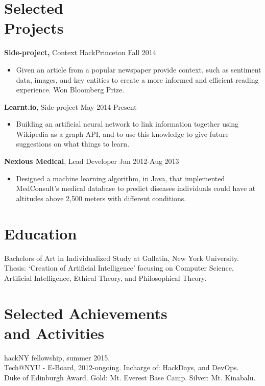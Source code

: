 \documentclass[margin]{res}
\begin{document}
\begin{resume}
\section{Selected \\ Projects}
{\bf Side-project,} Context \hfill HackPrinceton Fall 2014
\begin{itemize} \itemsep -2pt 
\item Given an article from a popular newspaper provide context, such as sentiment data, images, and key entities to create a more informed and efficient reading experience. Won Bloomberg Prize.
\end{itemize}
 
{\bf Learnt.io}, Side-project \hfill May 2014-Present
\begin{itemize} \itemsep -2pt 
\item Building an artificial neural network to link information together using Wikipedia as a graph API, and to use this knowledge to give future suggestions on what things to learn.
\end{itemize}
 
{\bf Nexious Medical}, Lead Developer \hfill Jan 2012-Aug 2013
\begin{itemize} \itemsep -2pt
\item Designed a machine learning algorithm, in Java, that implemented MedConsult's medical database to predict diseases individuals could have at altitudes above 2,500 meters with different conditions.
 \end{itemize}

\section{Education} 
Bachelors of Art in Individualized Study at Gallatin, New York University. \\
Thesis: `Creation of Artificial Intelligence' focusing on Computer Science, Artificial Intelligence, Ethical Theory, and Philosophical Theory.

\section{Selected Achievements \\ and Activities} 
hackNY fellowship, summer 2015. \\
Tech@NYU - E-Board, 2012-ongoing. Incharge of: HackDays, and DevOps. \\
Duke of Edinburgh Award. Gold: Mt. Everest Base Camp. Silver: Mt. Kinabalu.

\end{resume} 
\end{document}
